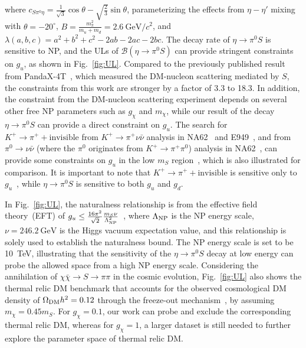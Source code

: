 \documentclass[
 reprint,
 amsmath,amssymb,a
 aps,
 twocolumn
]{revtex4-2}
\def \gev  {~\mbox{GeV}}
\def \gevcc{~\mbox{GeV/$c^2$}}
\begin{document}
where $c_{S\pi^0\eta} = \frac{1}{\sqrt{3}} \cos\theta - \sqrt{\frac{2}{3}} \sin\theta$, parameterizing the effects from $\eta-\eta'$ mixing with $\theta = -20^{\circ}$, $B=\frac{m^2_{\pi}}{m_u+m_d}=2.6\gevcc$, and $\lambda(a,b,c)=a^2+b^2+c^2-2ab-2ac-2bc$.
The decay rate of $\eta\to\pi^0S$ is sensitive to NP, and the ULs of $\mathcal{B}(\eta\to\pi^0S)$ can provide stringent constraints on $g_u$, as shown in Fig.~\ref{fig:UL}.
Compared to the previously published result from PandaX-4T~\cite{PandaX:2023tfq}, which measured the DM-nucleon scattering mediated by $S$, the constraints from this work are stronger by a factor of 3.3 to 18.3.
In addition, the constraint from the DM-nucleon scattering experiment depends on several other free NP parameters such as $g_{\chi}$ and $m_{\chi}$, while our result of the decay $\eta\to\pi^0S$ can provide a direct constraint on $g_u$.
The search for $ K^+ \to \pi^+ + \text{invisible} $ from $ K^+ \to \pi^+ \nu \bar{\nu} $ analysis in NA62~\cite{NA62:2025upx} and E949~\cite{BNL-E949:2009dza}, and from $ \pi^0 \to \nu \bar{\nu} $ (where the $ \pi^0 $ originates from $ K^+ \to \pi^+ \pi^0 $) analysis in NA62~\cite{NA62:2020pwi}, can provide some constraints on $ g_u $ in the low $ m_S $ region~\cite{Batell:2018fqo}, which is also illustrated for comparison. It is important to note that $ K^+ \to \pi^+ + \text{invisible} $ is sensitive only to $ g_u $~\cite{Batell:2018fqo}, while $ \eta \to \pi^0 S $ is sensitive to both $ g_u $ and $ g_d $.

In Fig.~\ref{fig:UL}, the naturalness relationship is from the effective field theory~(EFT) of $g_u \leq \frac{16\pi^2}{\sqrt{2}} \frac{m_S\nu}{\Lambda^2_{\rm{NP}}}$~\cite{Batell:2017kty},
where $\Lambda_{\rm{NP}}$ is the NP energy scale, $\nu=246.2\gev$ is the Higgs vacuum expectation value, and this relationship is solely used to establish the naturalness bound.
The NP energy scale is set to be 10~TeV, illustrating that the sensitivity of the $\eta\to\pi^0S$ decay at low energy can probe the allowed space from a high NP energy scale.
Considering the annihilation of $\chi\bar{\chi} \to S \to \pi\pi$ in the cosmic evolution, Fig.~\ref{fig:UL} also shows the thermal relic DM benchmark that accounts for the observed cosmological DM density of $\Omega_{\rm{DM}}h^2 = 0.12$ through the freeze-out mechanism~\cite{Batell:2018fqo,Scherrer:1985zt}, by assuming $m_{\chi} = 0.45 m_S$. For $g_{\chi} = 0.1$, our work can probe and exclude the corresponding thermal relic DM, whereas for $g_{\chi} = 1$, a larger dataset is still needed to further explore the parameter space of thermal relic DM.
\end{document}

